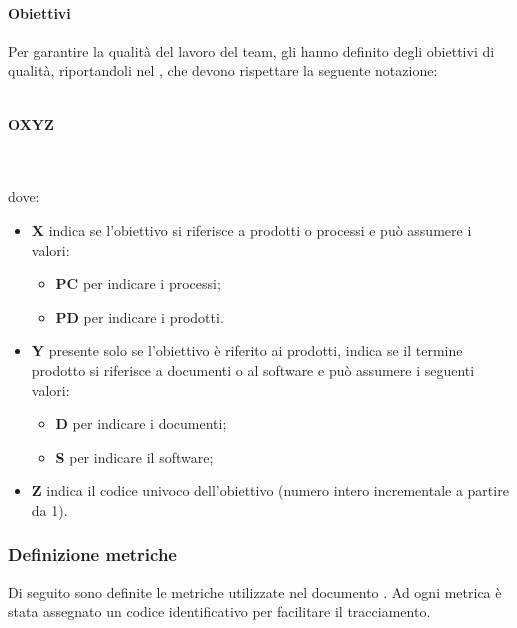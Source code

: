 \paragraph{Obiettivi}
Per garantire la qualità del lavoro del team, gli \AMMP{} hanno definito degli obiettivi di qualità,
riportandoli nel \PQdoc, che devono rispettare la seguente notazione:\\ \\
\centerline{\textbf{O\textbraceleft{}X\textbraceright{}\textbraceleft{}Y\textbraceright{}\textbraceleft{}Z\textbraceright{}}} \\ \\
dove:
\begin{itemize}
	\item \textbf{X} indica se l'obiettivo si riferisce a prodotti o processi e può assumere i valori:
	\begin{itemize}
		\item \textbf{PC} per indicare i processi;
		\item \textbf{PD} per indicare i prodotti.
	\end{itemize}
	\item \textbf{Y} presente solo se l'obiettivo è riferito ai prodotti, indica se il termine prodotto si riferisce a documenti o al software e può assumere i seguenti valori:
	\begin{itemize}
		\item \textbf{D} per indicare i documenti;
		\item \textbf{S} per indicare il software;
	\end{itemize}
	\item \textbf{Z} indica il codice univoco dell'obiettivo (numero intero incrementale a partire da 1).
\end{itemize}
\subsubsection{Definizione metriche}
Di seguito sono definite le metriche utilizzate nel documento \PQdoc{}. Ad ogni metrica è stata assegnato un codice identificativo per facilitare il tracciamento.
